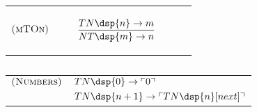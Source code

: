 \begin{table}[h]
    \begin{center}
        \begin{tabular}[c]{ll}
            $\textsc{(mTOn})$ & $\infrule{TN \dsp{n} \ra m}{NT \dsp{m} \ra n}$
        \end{tabular}
    \end{center}
    \caption{}
    \label{tab:}
\end{table}

\begin{table}[h]
    \begin{center}
        \begin{tabular}[c]{ll}
            $\textsc{(Numbers})$ &  $TN\dsp{0} \ra \quot{0}$\\
            & $TN\dsp{n+1} \ra \quot{TN\dsp{n}[next]}$
        \end{tabular}
    \end{center}
    \caption{}
    \label{tab:}
\end{table}
\FloatBarrier




\grid
\grids
